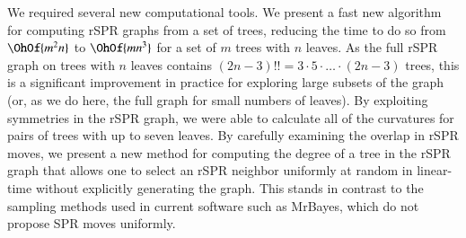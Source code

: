 \documentclass[]{elsarticle}
\begin{document}
We required several new computational tools.
We present a fast new algorithm for computing rSPR graphs from a set of trees, reducing the time to do so from $\OhOf{m^2n}$ to $\OhOf{mn^3}$ for a set of $m$ trees with $n$ leaves.
As the full rSPR graph on trees with $n$ leaves contains $(2n-3)!! = 3 \cdot 5 \cdot \ldots \cdot (2n-3)$ trees, this is a significant improvement in practice for exploring large subsets of the graph (or, as we do here, the full graph for small numbers of leaves).
By exploiting symmetries in the rSPR graph, we were able to calculate all of the curvatures for pairs of trees with up to seven leaves.
By carefully examining the overlap in rSPR moves, we present a new method for computing the degree of a tree in the rSPR graph that allows one to select an rSPR neighbor uniformly at random in linear-time without explicitly generating the graph.
This stands in contrast to the sampling methods used in current software such as MrBayes, which do not propose SPR moves uniformly.
\end{document}
